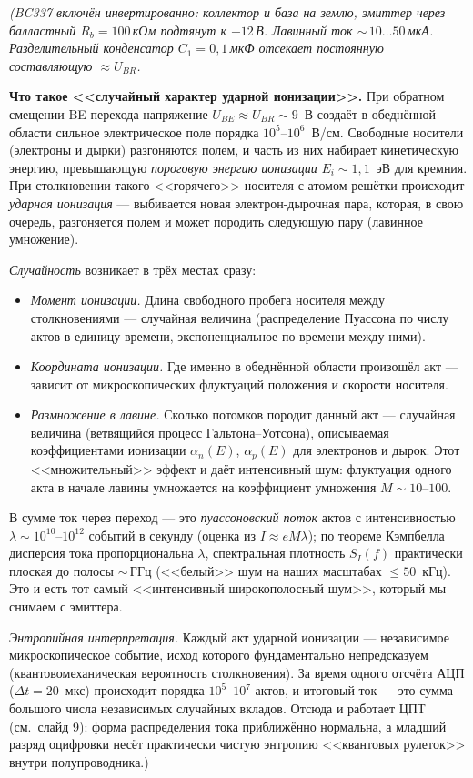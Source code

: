 \documentclass[12pt,a4paper]{extarticle}
\newcommand{\note}[1]{%
  \par
  {\small\color{noteclr}\itshape (#1)}%
  \par}
\begin{document}
\note{BC337 включён инвертированно: коллектор и база на землю, эмиттер через
балластный $R_b=100$\,кОм подтянут к $+12$\,В. Лавинный ток
${\sim}\,10\ldots 50$\,мкА. Разделительный конденсатор $C_1=0{,}1$\,мкФ
отсекает постоянную составляющую $\approx U_{BR}$.

\medskip
\textbf{Что такое <<случайный характер ударной ионизации>>.}
При обратном смещении BE-перехода напряжение $U_{BE}\!\approx\!U_{BR}\!\sim\!9$~В
создаёт в обеднённой области сильное электрическое поле порядка
$10^5$--$10^6$~В/см. Свободные носители (электроны и дырки) разгоняются полем,
и часть из них набирает кинетическую энергию, превышающую \emph{пороговую
энергию ионизации} $E_i\!\sim\!1{,}1$~эВ для кремния. При столкновении такого
<<горячего>> носителя с атомом решётки происходит \emph{ударная ионизация} ---
выбивается новая электрон-дырочная пара, которая, в свою очередь, разгоняется
полем и может породить следующую пару (лавинное умножение).

\emph{Случайность} возникает в трёх местах сразу:
\begin{itemize}\setlength{\itemsep}{0.1em}
  \item \emph{Момент ионизации.} Длина свободного пробега носителя между
        столкновениями --- случайная величина (распределение Пуассона по числу
        актов в единицу времени, экспоненциальное по времени между ними).
  \item \emph{Координата ионизации.} Где именно в обеднённой области произошёл
        акт --- зависит от микроскопических флуктуаций положения и скорости
        носителя.
  \item \emph{Размножение в лавине.} Сколько потомков породит данный акт ---
        случайная величина (ветвящийся процесс Гальтона--Уотсона), описываемая
        коэффициентами ионизации $\alpha_n(E)$, $\alpha_p(E)$ для электронов
        и дырок. Этот <<множительный>> эффект и даёт интенсивный шум:
        флуктуация одного акта в начале лавины умножается на коэффициент
        умножения $M\!\sim\!10$--$100$.
\end{itemize}

В сумме ток через переход --- это \emph{пуассоновский поток} актов с
интенсивностью $\lambda\!\sim\!10^{10}$--$10^{12}$ событий в секунду
(оценка из $I\!\approx\!eM\lambda$); по теореме Кэмпбелла дисперсия тока
пропорциональна $\lambda$, спектральная плотность $S_I(f)$ практически
плоская до полосы $\sim$\,ГГц (<<белый>> шум на наших масштабах
$\le\!50$~кГц). Это и есть тот самый <<интенсивный широкополосный шум>>,
который мы снимаем с эмиттера.

\emph{Энтропийная интерпретация.} Каждый акт ударной ионизации ---
независимое микроскопическое событие, исход которого фундаментально
непредсказуем (квантовомеханическая вероятность столкновения). За время
одного отсчёта АЦП ($\Delta t\!=\!20$~мкс) происходит порядка
$10^5$--$10^7$ актов, и итоговый ток --- это сумма большого числа
независимых случайных вкладов. Отсюда и работает ЦПТ (см.\ слайд 9):
форма распределения тока приближённо нормальна, а младший разряд оцифровки
несёт практически чистую энтропию <<квантовых рулеток>> внутри полупроводника.}
\end{document}
